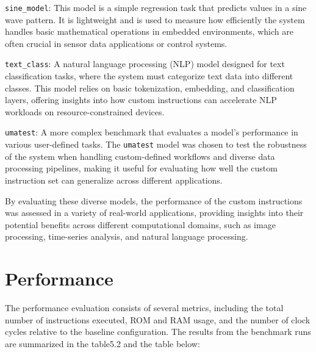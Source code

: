 \texttt{sine\_model}: This model is a simple regression task that predicts values in a sine wave pattern. It is lightweight and is used to measure how efficiently the system handles basic mathematical operations in embedded environments, which are often crucial in sensor data applications or control systems.

\texttt{text\_class}: A natural language processing (NLP) model designed for text classification tasks, where the system must categorize text data into different classes. This model relies on basic tokenization, embedding, and classification layers, offering insights into how custom instructions can accelerate NLP workloads on resource-constrained devices.

\texttt{umatest}: A more complex benchmark that evaluates a model's performance in various user-defined tasks. The \texttt{umatest} model was chosen to test the robustness of the system when handling custom-defined workflows and diverse data processing pipelines, making it useful for evaluating how well the custom instruction set can generalize across different applications.

By evaluating these diverse models, the performance of the custom instructions was assessed in a variety of real-world applications, providing insights into their potential benefits across different computational domains, such as image processing, time-series analysis, and natural language processing.

\section{Performance}

The performance evaluation consists of several metrics, including the total number of instructions executed, ROM and RAM usage, and the number of clock cycles relative to the baseline configuration. The results from the benchmark runs are summarized in the table5.2 and the table below:


